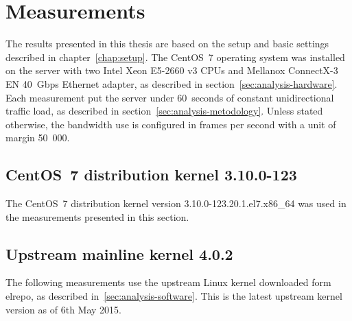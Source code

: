 
\chapter{Measurements}\label{chap:measurements}
The results presented in this thesis are based on the setup and basic settings described in chapter~\ref{chap:setup}.
The CentOS~7 operating system
was installed on the server with two Intel Xeon E5-2660 v3 CPUs
and Mellanox ConnectX-3 EN 40~Gbps Ethernet adapter, as described in section~\ref{sec:analysis-hardware}.
Each measurement put the server under 60~seconds of constant unidirectional traffic load,
as described in section~\ref{sec:analysis-metodology}.
Unless stated otherwise,
the bandwidth use is configured in frames per second with a unit of margin 50~000.

\section{CentOS~7 distribution kernel 3.10.0-123}
The CentOS~7 distribution kernel version 3.10.0-123.20.1.el7.x86\_64
was used in the measurements presented in this section.

	
	
	
	
	
	
	
	
	
	
	
	
	
	
	

	

\section{Upstream mainline kernel 4.0.2}
The following measurements use the upstream Linux kernel downloaded form elrepo, as described in~\ref{sec:analysis-software}.
This is the latest upstream kernel version as of 6th May 2015.

	
	
